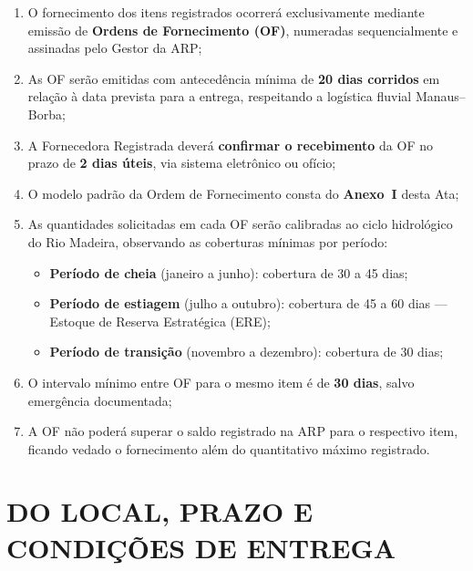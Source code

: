 \documentclass[12pt,a4paper]{article}
\begin{document}
\begin{enumerate}
  \item O fornecimento dos itens registrados ocorrerá exclusivamente mediante
    emissão de \textbf{Ordens de Fornecimento (OF)}, numeradas sequencialmente e
    assinadas pelo Gestor da ARP;

  \item As OF serão emitidas com antecedência mínima de \textbf{20 dias corridos}
    em relação à data prevista para a entrega, respeitando a logística fluvial
    Manaus--Borba;

  \item A Fornecedora Registrada deverá \textbf{confirmar o recebimento} da OF
    no prazo de \textbf{2 dias úteis}, via sistema eletrônico ou ofício;

  \item O modelo padrão da Ordem de Fornecimento consta do \textbf{Anexo~I}
    desta Ata;

  \item As quantidades solicitadas em cada OF serão calibradas ao ciclo hidrológico
    do Rio Madeira, observando as coberturas mínimas por período:
    \begin{itemize}
      \item \textbf{Período de cheia} (janeiro a junho): cobertura de 30 a 45 dias;
      \item \textbf{Período de estiagem} (julho a outubro): cobertura de 45 a 60
        dias --- Estoque de Reserva Estratégica (ERE);
      \item \textbf{Período de transição} (novembro a dezembro): cobertura de 30 dias;
    \end{itemize}

  \item O intervalo mínimo entre OF para o mesmo item é de \textbf{30 dias},
    salvo emergência documentada;

  \item A OF não poderá superar o saldo registrado na ARP para o respectivo item,
    ficando vedado o fornecimento além do quantitativo máximo registrado.
\end{enumerate}

\section{DO LOCAL, PRAZO E CONDIÇÕES DE ENTREGA}
\end{document}
